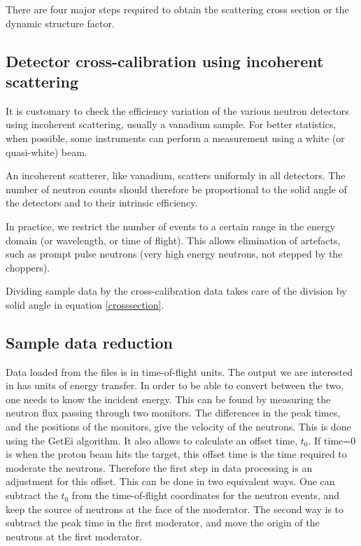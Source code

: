 There are four major steps required to obtain the scattering cross section or the dynamic structure factor.

\subsection{Detector cross-calibration using incoherent scattering}
It is customary to check the efficiency variation of the various neutron detectors using incoherent scattering, usually a vanadium sample. For better statistics, when possible, some instruments can perform a measurement using a white (or quasi-white) beam.

An incoherent scatterer, like vanadium, scatters uniformly in all detectors. The number of neutron counts should therefore be proportional to the solid angle of the detectors and to their intrinsic efficiency. 

In practice, we restrict the number of events to a certain range in the energy domain (or wavelength, or time of flight). This allows elimination of artefacts, such as prompt pulse neutrons (very high energy neutrons, not stepped by the choppers).

Dividing sample data by the cross-calibration data takes care of the division by solid angle in equation \ref{crosssection}. 

\subsection{Sample data reduction} 
Data loaded from the files is in time-of-flight units. The output we are interested in has units of energy transfer. In order to be able to convert between the two, one needs to know the incident energy. This can be found by measuring the neutron flux passing through two monitors. The differences in the peak times, and the positions of the monitors, give the velocity of the neutrons. This is done using the GetEi algorithm. It also allows to calculate an offset time, $t_0$. If time=0 is when the proton beam hits the target, this offset time is the time required to moderate the neutrons. Therefore the first step in data processing is an adjustment for this offset. This can be done in two equivalent ways. One can subtract the  $t_0$ from the time-of-flight coordinates for the neutron events, and keep the source of neutrons at the face of the moderator. The second way is to subtract the peak time in the first moderator, and move the origin of the neutrons at the first moderator.

